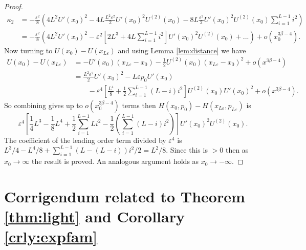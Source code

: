 \documentclass[bj,numbers,noshowframe]{imsart}
\theoremstyle{definition}
\theoremstyle{plain}
\theoremstyle{definition}
\begin{document}
\begin{proof}
\begin{align*}
\kappa_{2} & =-\frac{\varepsilon^{2}}{8}\left(4L^{2}U'(x_{0})^{2}-4L\frac{L^{2}\varepsilon^{2}}{2}U'(x_{0})^{2}U^{(2)}(x_{0})-8L\frac{\varepsilon^{2}}{2}U'(x_{0})^{2}U^{(2)}(x_{0})\sum_{i=1}^{L-1}i^{2}\right)\\
 & =-\frac{\varepsilon^{2}}{8}\left(4L^{2}U'(x_{0})^{2}-\varepsilon^{2}\left[2L^{3}+4L\sum_{i=1}^{L-1}i^{2}\right]U'(x_{0})^{2}U^{(2)}(x_{0})+...\right)+o(x_{0}^{3\beta-4}).
\end{align*}
Now turning to $U(x_{0})-U(x_{L\varepsilon})$ and using Lemma \ref{lem:distance}
we have
\begin{align*}
U(x_{0})-U(x_{L\varepsilon}) & =-U'(x_{0})(x_{L\varepsilon}-x_{0})-\frac{1}{2}U^{(2)}(x_{0})(x_{L\varepsilon}-x_{0})^{2}+o(x^{3\beta-4})\\
 & =\frac{L^{2}\varepsilon^{2}}{2}U'(x_{0})^{2}-L\varepsilon p_{0}U'(x_{0})\\
 & \qquad -\varepsilon^{4}\left[\frac{L^{4}}{8}+\frac{1}{2}\sum_{i=1}^{L-1}(L-i)i^{2}\right]U^{(2)}(x_{0})U'(x_{0})^{2}+o(x^{3\beta-4}).
\end{align*}
So combining gives up to $o\left(x_{0}^{3\beta-4}\right)$ terms then $H(x_{0},p_{0})-H(x_{L\varepsilon},p_{L\varepsilon})$ is
\[
\varepsilon^{4}\left[\frac{1}{4}L^{3}-\frac{1}{8}L^{4}+\frac{1}{2}\sum_{i=1}^{L-1}Li^{2}-\frac{1}{2}\left(\sum_{i=1}^{L-1}(L-i)i^{2}\right)\right]U'(x_{0})^{2}U^{(2)}(x_{0}).
\]
The coefficient of the leading order term divided by $\varepsilon^{4}$
is $L^{3}/4-L^{4}/8+\sum_{i=1}^{L-1}(L-(L-i))i^{2}/2=L^{2}/8$. Since
this is $>0$ then as $x_{0}\to\infty$ the result is proved. An analogous
argument holds as $x_{0}\to-\infty$.
\end{proof}


\section{Corrigendum related to Theorem \ref{thm:light} and Corollary \ref{crly:expfam}}

\makeatletter\let\section\specialsection\setcounter{section}{0}\gdef\thesection{\arabic{section}}\gdef\section@prefix{}\gdef\section@numbersep{.}\makeatother


\end{document}

